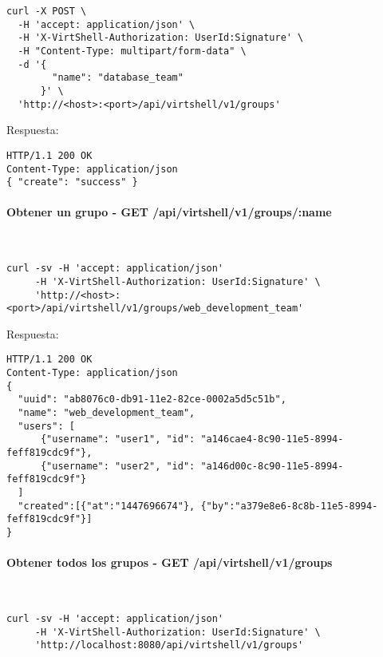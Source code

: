 \begin{lstlisting}[style=json]
curl -X POST \
  -H 'accept: application/json' \
  -H 'X-VirtShell-Authorization: UserId:Signature' \
  -H "Content-Type: multipart/form-data" \
  -d '{
        "name": "database_team"
      }' \
  'http://<host>:<port>/api/virtshell/v1/groups'
\end{lstlisting}

\vspace{1cm}
Respuesta:
\vspace{1cm}

\begin{lstlisting}[style=json]
HTTP/1.1 200 OK
Content-Type: application/json
{ "create": "success" }
\end{lstlisting}

\paragraph{Obtener un grupo - GET /api/virtshell/v1/groups/:name} ~\\

\begin{lstlisting}[style=json]
curl -sv -H 'accept: application/json' 
     -H 'X-VirtShell-Authorization: UserId:Signature' \ 
     'http://<host>:<port>/api/virtshell/v1/groups/web_development_team'
\end{lstlisting}

\vspace{1cm}
Respuesta:
\vspace{1cm}

\begin{lstlisting}[style=json]
HTTP/1.1 200 OK
Content-Type: application/json
{
  "uuid": "ab8076c0-db91-11e2-82ce-0002a5d5c51b",
  "name": "web_development_team",
  "users": [ 
      {"username": "user1", "id": "a146cae4-8c90-11e5-8994-feff819cdc9f"},
      {"username": "user2", "id": "a146d00c-8c90-11e5-8994-feff819cdc9f"}
  ]
  "created":[{"at":"1447696674"}, {"by":"a379e8e6-8c8b-11e5-8994-feff819cdc9f"}]
}
\end{lstlisting}

\paragraph{Obtener todos los grupos - GET /api/virtshell/v1/groups} ~\\

\begin{lstlisting}[style=json]
curl -sv -H 'accept: application/json' 
     -H 'X-VirtShell-Authorization: UserId:Signature' \ 
     'http://localhost:8080/api/virtshell/v1/groups'
\end{lstlisting}


